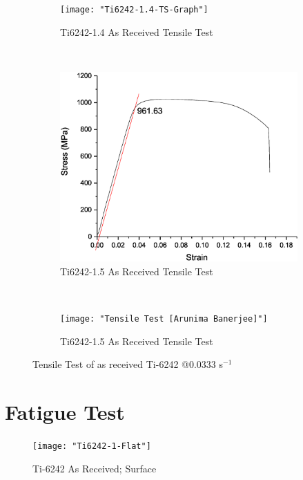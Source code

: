 \begin{figure}[H]
    \centering
    \begin{subfigure}{0.48\textwidth}
        \texttt{[image: "Ti6242-1.4-TS-Graph"]}
        \caption{Ti6242-1.4 As Received Tensile Test}
        \label{fig:2a}
    \end{subfigure}
    ~
    \begin{subfigure}{0.48\textwidth}
        \includegraphics[width=\textwidth]{"Ti6242-1.5-TS-Graph"}
        \caption{Ti6242-1.5 As Received Tensile Test}
        \label{fig:2b}
    \end{subfigure}
    \\
    \begin{subfigure}{0.48\textwidth}
        \texttt{[image: "Tensile Test [Arunima Banerjee]"]}
        \caption{Ti6242-1.5 As Received Tensile Test}
        \label{fig:2b}
    \end{subfigure} 
     
    \caption{Tensile Test of as received Ti-6242 @0.0333 s$ ^{-1} $}
    \label{fig:Tensile-Test-6242}
\end{figure}

\section{Fatigue Test}
\begin{figure}[H]
    \centering
        \texttt{[image: "Ti6242-1-Flat"]}
        \caption{Ti-6242 As Received; Surface}
    \label{fig:EDM-Cut}
\end{figure}